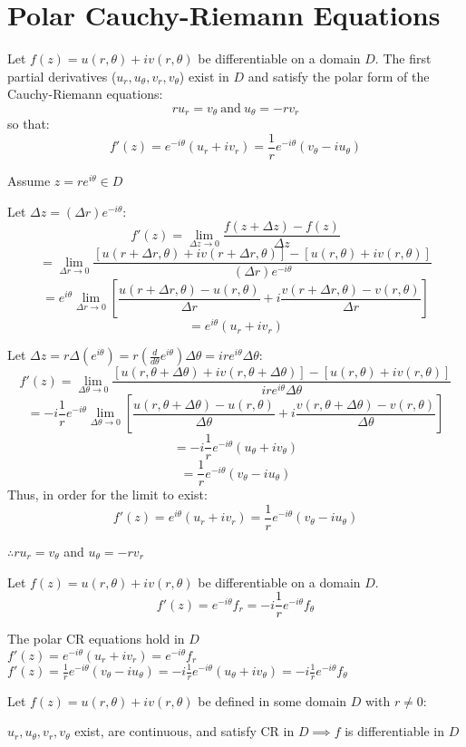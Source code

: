 \documentclass[letterpaper,12pt,fleqn]{article}
\renewcommand{\o}{\theta}
\newcommand{\D}{\Delta}
\newcommand{\Dz}{\D z}
\newcommand{\Dr}{\D r}
\newcommand{\Do}{\D\o}
\newcommand{\limDz}{\lim_{\Dz\to0}}
\newcommand{\limDr}{\lim_{\Dr\to0}}
\newcommand{\limDo}{\lim_{\Do\to0}}
\begin{document}
\section*{Polar Cauchy-Riemann Equations}

\begin{theorem}
  Let $f(z)=u(r,\o)+iv(r,\o)$ be differentiable on a domain $D$. The first
  partial derivatives ($u_r,u_{\o},v_r,v_{\o}$) exist in $D$ and satisfy the
  polar form of the Cauchy-Riemann equations:
  \[ru_r=v_{\o}\ \mbox{and}\ u_{\o}=-rv_r\]
  so that:
  \[f'(z)=e^{-i\o}(u_r+iv_r)=\frac{1}{r}e^{-i\o}(v_{\o}-iu_{\o})\]
\end{theorem}

\begin{theproof}
  Assume $z=re^{i\o}\in D$

  Let $\Dz=(\Dr)e^{-i\o}$:
  \[f'(z)=\limDz{\frac{f(z+\Dz)-f(z)}{\Dz}}\]
  \[=\limDr{\frac{[u(r+\Dr,\o)+iv(r+\Dr,\o)]-[u(r,\o)+iv(r,\o)]}
    {(\Dr)e^{-i\o}}}\]
  \[=e^{i\o}\limDr{\left[\frac{u(r+\Dr,\o)-u(r,\o)}{\Dr}+
      i\frac{v(r+\Dr,\o)-v(r,\o)}{\Dr}\right]}\]
  \[=e^{i\o}(u_r+iv_r)\]

  Let $\Dz=r\D(e^{i\o})=r\left(\frac{d}{d\o}e^{i\o}\right)\Do=ire^{i\o}\Do$:
  \[f'(z)=\limDo{\frac{[u(r,\o+\Do)+iv(r,\o+\Do)]-[u(r,\o)+iv(r,\o)]}
    {ire^{i\o}\Do}}\]
  \[=-i\frac{1}{r}e^{-i\o}\limDo{\left[\frac{u(r,\o+\Do)-u(r,\o)}{\Do}+
      i\frac{v(r,\o+\Do)-v(r,\o)}{\Do}\right]}\]
  \[=-i\frac{1}{r}e^{-i\o}(u_{\o}+iv_{\o})\]
  \[=\frac{1}{r}e^{-i\o}(v_{\o}-iu_{\o})\]
  Thus, in order for the limit to exist:
  \[f'(z)=e^{i\o}(u_r+iv_r)=\frac{1}{r}e^{-i\o}(v_{\o}-iu_{\o})\]

  $\therefore ru_r=v_{\o}$ and $u_{\o}=-rv_r$
\end{theproof}

\begin{corollary}
  Let $f(z)=u(r,\o)+iv(r,\o)$ be differentiable on a domain $D$.
  \[f'(z)=e^{-i\o}f_r=-i\frac{1}{r}e^{-i\o}f_{\o}\]
\end{corollary}

\begin{theproof}
  The polar CR equations hold in $D$ \\
  $f'(z)=e^{-i\o}(u_r+iv_r)=e^{-i\o}f_r$ \\
  $f'(z)=\frac{1}{r}e^{-i\o}(v_{\o}-iu_{\o})=-i\frac{1}{r}e^{-i\o}(u_{\o}+iv_{\o})=
  -i\frac{1}{r}e^{-i\o}f_{\o}$
\end{theproof}

\begin{theorem}
  Let $f(z)=u(r,\o)+iv(r,\o)$ be defined in some domain $D$ with $r\ne0$:

  $u_r,u_{\o},v_r,v_{\o}$ exist, are continuous, and satisfy CR in $D\implies f$
  is differentiable in $D$
\end{theorem}
\end{document}
